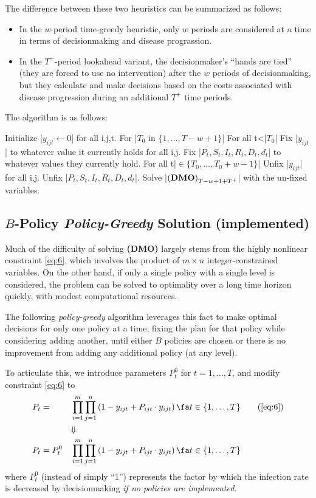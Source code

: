 \documentclass{article}
\newcommand{\model}{{\bf (DMO) }}
\begin{document}
    The difference between these two heuristics can be summarized as follows:
    \begin{itemize}
        \item In the $w$-period time-greedy heuristic, only $w$ periods are considered at a time in terms of decisionmaking and disease prograssion.
        \item In the $T^+$-period lookahead variant, the decisionmaker's ``hands are tied'' (they are forced to use no intervention) after the $w$ periods of decisionmaking, but they calculate and make decisions based on the costs associated with disease progression during an additional $T^+$ time periods.
    \end{itemize}
    The algorithm is as follows:
    \begin{pseudocode}
        Initialize |$y_{ijt}\leftarrow0$| for all i,j,t.
        For |$T_0$ in $\{1,\ldots,T-w+1\}$|
            For all t<|$T_0$|
                Fix |$y_{ijt}$| to whatever value it currently holds for all i,j.
                Fix |$P_t,S_t,I_t,R_t,D_t,d_t$| to whatever values they currently hold.
            For all t|$\in\{T_0,\ldots,T_0+w-1\}$|
                Unfix |$y_{ijt}$| for all i,j. Unfix |$P_t,S_t,I_t,R_t,D_t,d_t$|.
            Solve |${\model}_{T-w+1 + T^+}$| with the un-fixed variables.
    \end{pseudocode}

\subsection{$B$-Policy \emph{Policy-Greedy} Solution (implemented)}

Much of the difficulty of solving \model largely stems from the highly nonlinear constraint \eqref{eq:6}, which involves the product of $m\times n$ integer-constrained variables. On the other hand, if only a single policy with a single level is considered, the problem can be solved to optimality over a long time horizon quickly, with modest computational resources.

The following \emph{policy-greedy} algorithm leverages this fact to make optimal decisions for only one policy at a time, fixing the plan for that policy while considering adding another, until either $B$ policies are chosen or there is no improvement from adding any additional policy (at any level).

To articulate this, we introduce parameters $P_t^0$ for $t=1,\ldots,T$, and modify constraint \eqref{eq:6} to
\begin{alignat}{3}
   & P_t = &&\prod_{i=1}^{m}\prod_{j=1}^{n}\left(1-y_{ijt} + P_{ijt}\cdot y_{ijt}\right) \fa t \in \{1,\ldots,T\} \tag{\ref{eq:6}}\\
   & &&\mathbf{\Downarrow}\nonumber\\
   & P_t = P_t^0&&\prod_{i=1}^{m}\prod_{j=1}^{n}\left(1-y_{ijt} + P_{ijt}\cdot y_{ijt}\right) \fa t \in \{1,\ldots,T\}\label{eq:6_modified}
\end{alignat}
where $P_t^0$ (instead of simply ``$1$'') represents the factor by which the infection rate is decreased by decisionmaking \emph{if no policies are implemented}.
\end{document}
